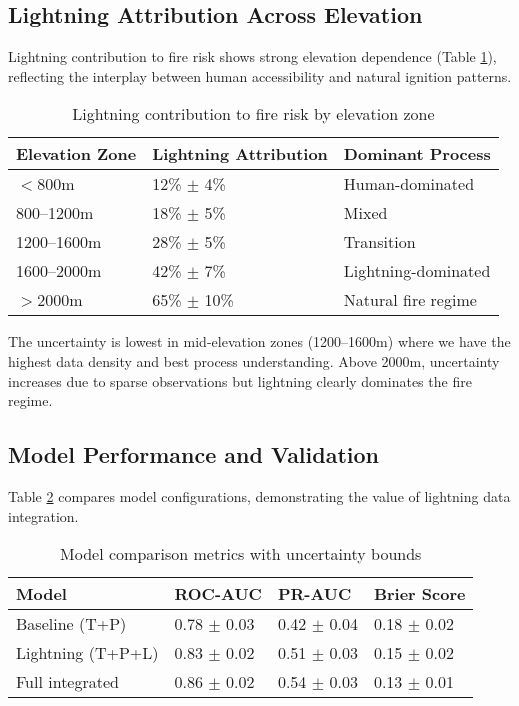 \documentclass[11pt,a4paper]{article}
\begin{document}
\subsection{Lightning Attribution Across Elevation}

Lightning contribution to fire risk shows strong elevation dependence (Table \ref{tab:lightning_elevation}), reflecting the interplay between human accessibility and natural ignition patterns.

\begin{table}[H]
\centering
\caption{Lightning contribution to fire risk by elevation zone}
\label{tab:lightning_elevation}
\begin{tabular}{lll}
\toprule
\textbf{Elevation Zone} & \textbf{Lightning Attribution} & \textbf{Dominant Process} \\
\midrule
$<$800m & 12\% $\pm$ 4\% & Human-dominated \\
800--1200m & 18\% $\pm$ 5\% & Mixed \\
1200--1600m & 28\% $\pm$ 5\% & Transition \\
1600--2000m & 42\% $\pm$ 7\% & Lightning-dominated \\
$>$2000m & 65\% $\pm$ 10\% & Natural fire regime \\
\bottomrule
\end{tabular}
\end{table}

The uncertainty is lowest in mid-elevation zones (1200--1600m) where we have the highest data density and best process understanding. Above 2000m, uncertainty increases due to sparse observations but lightning clearly dominates the fire regime.

\subsection{Model Performance and Validation}

Table \ref{tab:model_performance} compares model configurations, demonstrating the value of lightning data integration.

\begin{table}[H]
\centering
\caption{Model comparison metrics with uncertainty bounds}
\label{tab:model_performance}
\begin{tabular}{llll}
\toprule
\textbf{Model} & \textbf{ROC-AUC} & \textbf{PR-AUC} & \textbf{Brier Score} \\
\midrule
Baseline (T+P) & 0.78 $\pm$ 0.03 & 0.42 $\pm$ 0.04 & 0.18 $\pm$ 0.02 \\
Lightning (T+P+L) & 0.83 $\pm$ 0.02 & 0.51 $\pm$ 0.03 & 0.15 $\pm$ 0.02 \\
Full integrated & 0.86 $\pm$ 0.02 & 0.54 $\pm$ 0.03 & 0.13 $\pm$ 0.01 \\
\bottomrule
\end{tabular}
\end{table}
\end{document}
